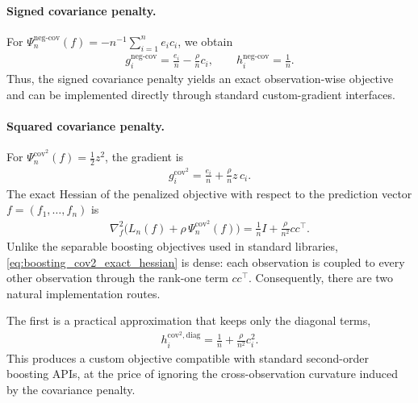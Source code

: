 \documentclass[12pt, draft]{article}
\theoremstyle{plain}
\theoremstyle{definition}
\newcommand{\1}{\mathbf{1}}
\begin{document}
\paragraph{Signed covariance penalty.}
For \(\Psi_n^{\mathrm{neg\mbox{-}cov}}(f) = -n^{-1}\sum_{i=1}^n e_i c_i\), we obtain
\begin{align}
    \label{eq:boosting_negcov_grad_hess}
    g_i^{\mathrm{neg\mbox{-}cov}}
    =
    \frac{e_i}{n}
    -
    \frac{\rho}{n}c_i,
    \qquad
    h_i^{\mathrm{neg\mbox{-}cov}}
    =
    \frac{1}{n}.
\end{align}
Thus, the signed covariance penalty yields an exact observation-wise objective and can be implemented directly through standard custom-gradient interfaces.

\paragraph{Squared covariance penalty.}
For \(\Psi_n^{\mathrm{cov}^2}(f)=\tfrac12 z^2\), the gradient is
\begin{align}
    \label{eq:boosting_cov2_gradient}
    g_i^{\mathrm{cov}^2}
    =
    \frac{e_i}{n}
    +
    \frac{\rho}{n}z\,c_i.
\end{align}
The exact Hessian of the penalized objective with respect to the prediction vector \(f=(f_1,\dots,f_n)\) is
\begin{align}
    \label{eq:boosting_cov2_exact_hessian}
    \nabla_f^2
    \bigl(L_n(f)+\rho\,\Psi_n^{\mathrm{cov}^2}(f)\bigr)
    =
    \frac{1}{n}I
    +
    \frac{\rho}{n^2}cc^\top.
\end{align}
Unlike the separable boosting objectives used in standard libraries, \eqref{eq:boosting_cov2_exact_hessian} is dense: each observation is coupled to every other observation through the rank-one term \(cc^\top\). Consequently, there are two natural implementation routes.

The first is a practical approximation that keeps only the diagonal terms,
\begin{align}
    \label{eq:boosting_cov2_diag_hessian}
    h_i^{\mathrm{cov}^2,\mathrm{diag}}
    =
    \frac{1}{n}
    +
    \frac{\rho}{n^2}c_i^2.
\end{align}
This produces a custom objective compatible with standard second-order boosting APIs, at the price of ignoring the cross-observation curvature induced by the covariance penalty.
\end{document}
